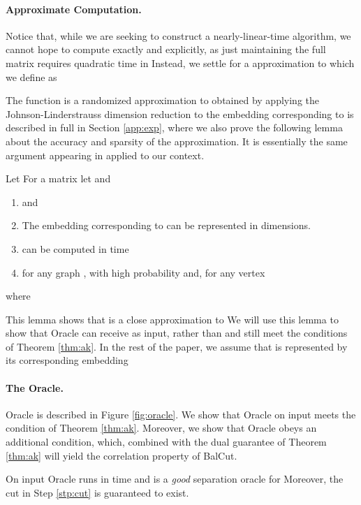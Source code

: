\documentclass[twoside,leqno,twocolumn]{article}
\numberwithin{equation}{section}
\begin{document}
\paragraph{Approximate Computation.} 
Notice that, while we are seeking to construct a nearly-linear-time algorithm, we cannot hope to compute  exactly and explicitly, as just maintaining the full  matrix requires quadratic time in   
Instead, we settle for a approximation   to  which we define as

The function  is a randomized approximation to  obtained by applying the Johnson-Linderstrauss dimension reduction to the embedding corresponding to   is described in full in Section \ref{app:exp}, where we also prove the following lemma about the accuracy and sparsity of the approximation. It is essentially the same argument appearing in \cite{Kthesis} applied to our context.

\begin{lemma}\label{lem:approx}
Let 
For a matrix   let  and 
\begin{enumerate}
\item  and 
\item The embedding  corresponding to  can be represented in  dimensions.
\item  can be computed in time 
\item for any graph , with high probability
 and, for any vertex 


\end{enumerate}
where 
\end{lemma}
This lemma shows that   is a close approximation to  
We will use this lemma to show that {\sc Oracle}\xspace can receive   as input, rather than   and still meet the conditions of Theorem \ref{thm:ak}.
In the rest of the paper, we assume that  is represented by its corresponding embedding 


\paragraph{The Oracle.} {\sc Oracle}\xspace is described in Figure \ref{fig:oracle}.
 We show that {\sc Oracle}\xspace on input  meets the condition of Theorem \ref{thm:ak}. Moreover, we show that {\sc Oracle}\xspace obeys an additional condition, which, combined with the dual guarantee of Theorem \ref{thm:ak} will yield the correlation property of {\sc BalCut}.
\begin{theorem} \label{thm:oracle}
On input  {\sc Oracle} runs in time  and is a {\it good} separation oracle for  Moreover, the cut  in Step \ref{stp:cut} is guaranteed to exist.

\end{theorem}
\end{document}
